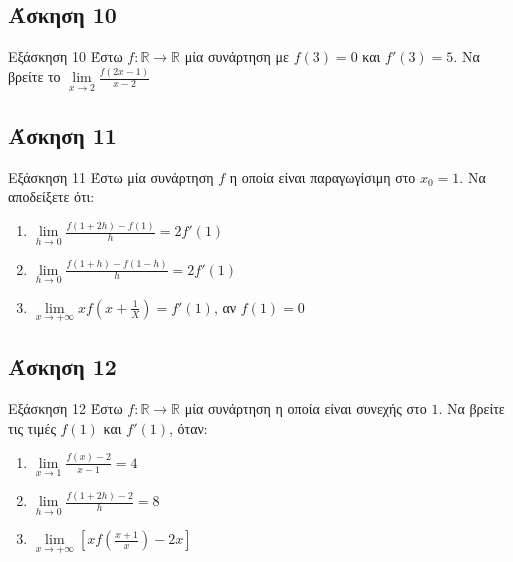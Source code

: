 \documentclass[greek]{beamer}
\begin{document}
\subsection{Άσκηση 10}
\begin{frame}[label=Άσκηση10]{Εξάσκηση 10}
 Έστω $f:\mathbb{R}\to\mathbb{R}$ μία συνάρτηση με $f(3)=0$ και $f'(3)=5$. Να βρείτε το $\lim\limits_{x \to 2}{ \frac{f(2x-1)}{x-2} }$

\end{frame}

\subsection{Άσκηση 11}
\begin{frame}[label=Άσκηση11]{Εξάσκηση 11}
 Έστω μία συνάρτηση $f$ η οποία είναι παραγωγίσιμη στο $x_0=1$. Να αποδείξετε ότι:
 \begin{enumerate}
  \item<1-> $\lim\limits_{h \to 0}{ \frac{f(1+2h)-f(1)}{h} }=2f'(1)$
  \item<2-> $\lim\limits_{h \to 0}{ \frac{f(1+h)-f(1-h)}{h} }=2f'(1)$
  \item<3-> $\lim\limits_{x \to +\infty}{ xf\left( x+\frac{1}{X} \right) }=f'(1)$, αν $f(1)=0$
 \end{enumerate}

\end{frame}

\subsection{Άσκηση 12}
\begin{frame}[label=Άσκηση12]{Εξάσκηση 12}
 Έστω $f:\mathbb{R}\to\mathbb{R}$ μία συνάρτηση η οποία είναι συνεχής στο $1$. Να βρείτε τις τιμές $f(1)$ και $f'(1)$, όταν:
 \begin{enumerate}
  \item<1-> $\lim\limits_{x \to 1}{ \frac{f(x)-2}{x-1} }=4$
  \item<2-> $\lim\limits_{h \to 0}{ \frac{f(1+2h)-2}{h} }=8$
  \item<3-> $\lim\limits_{x \to +\infty}{ \left[ xf\left( \frac{x+1}{x} \right)-2x   \right]  }$
 \end{enumerate}

\end{frame}
\end{document}
